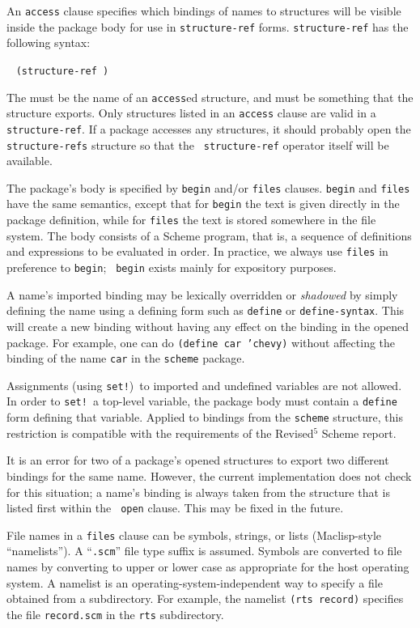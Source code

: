 An {\tt access} clause specifies which bindings of names to structures
will be visible inside the package body for use in {\tt structure-ref}
forms.  {\tt structure-\ok{}ref} has the following syntax:
\begin{tabbing}
\qquad {} \goesto{}~
   \tt(structure-ref  )
\end{tabbing}
The  must be the name of an {\tt access}ed structure,
and  must be something that the structure exports.  Only
structures listed in an {\tt access} clause are valid in a {\tt
structure-ref}.  If a package accesses any structures, it should
probably open the {\tt structure-refs} structure so that the {\tt
structure-ref} operator itself will be available.

The package's body is specified by {\tt begin} and/or {\tt files}
clauses.  {\tt begin} and {\tt files} have the same semantics, except
that for {\tt begin} the text is given directly in the package
definition, while for {\tt files} the text is stored somewhere in the
file system.  The body consists of a Scheme program, that is, a
sequence of definitions and expressions to be evaluated in order.  In
practice, we always use {\tt files} in preference to {\tt begin}; {\tt
begin} exists mainly for expository purposes.

A name's imported binding may be lexically overridden or {\em shadowed}
by simply defining the name using a defining form such as {\tt define}
or {\tt define-\ok{}syntax}.  This will create a new binding without having
any effect on the binding in the opened package.  For example, one can
do {\tt(define car 'chevy)} without affecting the binding of the name
{\tt car} in the {\tt scheme} package.

Assignments (using {\tt set!})\ to imported and undefined variables
are not allowed.  In order to {\tt set!}\ a top-level variable, the
package body must contain a {\tt define} form defining that variable.
Applied to bindings from the {\tt scheme} structure, this restriction
is compatible with the requirements of the Revised$^5$ Scheme report.

It is an error for two of a package's opened structures to export two
different bindings for the same name.  However, the current
implementation does not check for this situation; a name's binding is
always taken from the structure that is listed first within the {\tt
open} clause.  This may be fixed in the future.

File names in a {\tt files} clause can be symbols, strings, or lists
(Maclisp-style ``namelists'').  A ``{\tt.scm}'' file type suffix is
assumed.  Symbols are converted to file names by converting to upper
or lower case as appropriate for the host operating system.  A
namelist is an operating-system-independent way to specify a file
obtained from a subdirectory.  For example, the namelist {\tt(rts
record)} specifies the file {\tt record.scm} in the {\tt rts}
subdirectory.

